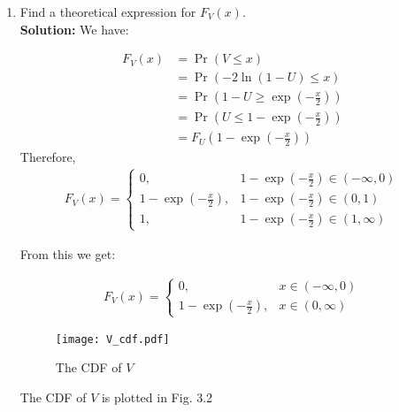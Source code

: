 \documentclass[journal,12pt,twocolumn]{IEEEtran}
\newcommand{\solution}{\noindent \textbf{Solution: }}
\providecommand{\pr}[1]{\ensuremath{\Pr\left(#1\right)}}
\numberwithin{equation}{section}
\renewcommand\thesection{\arabic{section}}
\begin{document}
\begin{enumerate}[label=\thesection.\arabic*
,ref=\thesection.\theenumi]
\begin{enumerate}[label=\thesection.\arabic*
,ref=\thesection.\theenumi]
\item Find a theoretical expression for $F_V(x)$.
\\
\solution  We have:
    
\begin{align}
F_V(x) &= \pr{V \leq x} \\
&= \pr{-2\ln(1-U) \leq x} \\
&= \pr{1-U \geq	\exp{\left(-\frac{x}{2}\right)}} \\
&= \pr{U \leq 1 - \exp{\left(-\frac{x}{2}\right)}} \\
&= F_U\left(1 - \exp{\left(-\frac{x}{2}\right)}\right) 
\end{align}
Therefore,
    \begin{align}
       F_V(x) =
        \begin{cases}
            0, & 1 - \exp{\left(-\frac{x}{2}\right)} \in (-\infty,0) \\
            1 - \exp{\left(-\frac{x}{2}\right)}, & 1 - \exp{\left(-\frac{x}{2}\right)} \in (0,1) \\
            1, & 1 - \exp{\left(-\frac{x}{2}\right)} \in (1, \infty)
        \end{cases}
    \end{align}
    
    From this we get:
    
    \begin{align}
       F_V(x) =
        \begin{cases}
            0, & x \in (-\infty,0) \\
            1 - \exp{\left(-\frac{x}{2}\right)}, & x \in (0,\infty) 
        \end{cases}
    \end{align}
    \begin{figure}
        \centering
        \texttt{[image: V\_cdf.pdf]}
        \caption{The CDF of $V$}
        \label{fig:V_cdf.pdf}
        \end{figure}
    The CDF of $V$ is plotted in Fig. 3.2
%
    \end{enumerate}


\end{enumerate}
\end{document}
